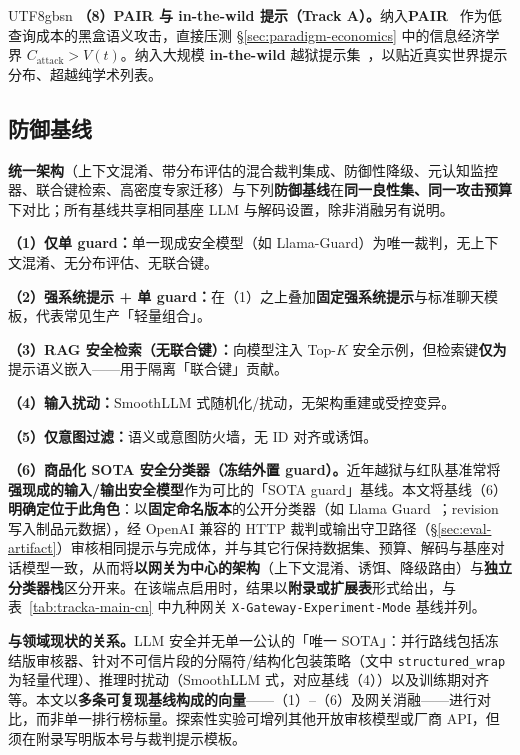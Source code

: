 \documentclass[letterpaper,twocolumn,10pt]{article}
\begin{document}
\begin{CJK}{UTF8}{gbsn}
\textbf{（8）PAIR 与 in-the-wild 提示（Track A）。}纳入\textbf{PAIR}~\cite{pair-jailbreak} 作为低查询成本的黑盒语义攻击，直接压测 \S\ref{sec:paradigm-economics} 中的信息经济学界 $C_{\mathrm{attack}} > V(t)$。纳入大规模 \textbf{in-the-wild} 越狱提示集~\cite{wild-jailbreak-prompts}，以贴近真实世界提示分布、超越纯学术列表。

\subsection{防御基线}
\label{sec:eval-defense}

\textbf{统一架构}（上下文混淆、带分布评估的混合裁判集成、防御性降级、元认知监控器、联合键检索、高密度专家迁移）与下列\textbf{防御基线}在\textbf{同一良性集、同一攻击预算}下对比；所有基线共享相同基座 LLM 与解码设置，除非消融另有说明。

\textbf{（1）仅单 guard：}单一现成安全模型（如 Llama-Guard）为唯一裁判，无上下文混淆、无分布评估、无联合键。

\textbf{（2）强系统提示 + 单 guard：}在（1）之上叠加\textbf{固定强系统提示}与标准聊天模板，代表常见生产「轻量组合」。

\textbf{（3）RAG 安全检索（无联合键）：}向模型注入 Top-$K$ 安全示例，但检索键\textbf{仅为}提示语义嵌入——用于隔离「联合键」贡献。

\textbf{（4）输入扰动：}SmoothLLM 式随机化/扰动，无架构重建或受控变异。

\textbf{（5）仅意图过滤：}语义或意图防火墙，无 ID 对齐或诱饵。

\textbf{（6）商品化 SOTA 安全分类器（冻结外置 guard）。}近年越狱与红队基准常将\textbf{强现成的输入/输出安全模型}作为可比的「SOTA guard」基线。本文将基线（6）\textbf{明确定位于此角色}：以\textbf{固定命名版本}的公开分类器（如 Llama Guard~\cite{llama-guard}；revision 写入制品元数据），经 OpenAI 兼容的 HTTP 裁判或输出守卫路径（\S\ref{sec:eval-artifact}）审核相同提示与完成体，并与其它行保持数据集、预算、解码与基座对话模型一致，从而将\textbf{以网关为中心的架构}（上下文混淆、诱饵、降级路由）与\textbf{独立分类器栈}区分开来。在该端点启用时，结果以\textbf{附录或扩展表}形式给出，与表~\ref{tab:tracka-main-cn} 中九种网关 \texttt{X-Gateway-Experiment-Mode} 基线并列。

\noindent\textbf{与领域现状的关系。}LLM 安全并无单一公认的「唯一 SOTA」：并行路线包括冻结版审核器、针对不可信片段的分隔符/结构化包装策略（文中 \texttt{structured\_wrap} 为轻量代理）、推理时扰动（SmoothLLM 式，对应基线（4））以及训练期对齐等。本文以\textbf{多条可复现基线构成的向量}——（1）--（6）及网关消融——进行对比，而非单一排行榜标量。探索性实验可增列其他开放审核模型或厂商 API，但须在附录写明版本号与裁判提示模板。


\end{CJK}
\end{document}

